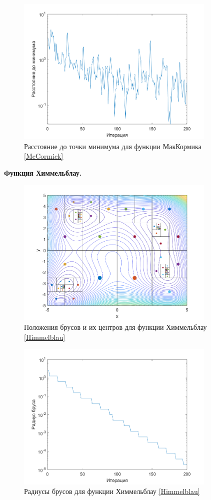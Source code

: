 \begin{figure}[H]
\centering
\includegraphics[width=0.85\textwidth]{Graphics/McCormick_dist_to_min.png}
\caption{Расстояние до точки минимума для функции МакКормика \eqref{McCormick}} 
\end{figure}
\noindent\textbf{Функция Химмельблау.}\\
\begin{figure}[H]
\centering
\includegraphics[width=0.85\textwidth]{Graphics/Himmelblau_algo.png}
\caption{Положения брусов и их центров для функции Химмельблау \eqref{Himmelblau}} 
\end{figure}
\begin{figure}[H]
\centering
\includegraphics[width=0.85\textwidth]{Graphics/Himmelblau_bar_rad.png}
\caption{Радиусы брусов для функции Химмельблау \eqref{Himmelblau}} 
\end{figure}
